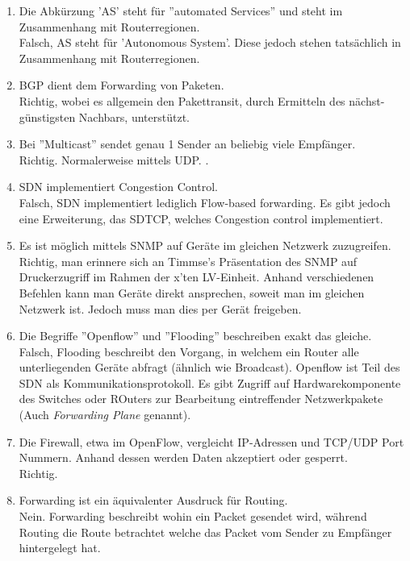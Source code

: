 \documentclass{article}
\begin{document}
\begin{enumerate}
        \item Die Abkürzung 'AS' steht für ''automated Services'' und steht im Zusammenhang mit Routerregionen.\\
        Falsch, AS steht für 'Autonomous System'. Diese jedoch stehen tatsächlich in Zusammenhang mit Routerregionen.
        
        \item BGP dient dem Forwarding von Paketen.\\
        Richtig, wobei es allgemein den Pakettransit, durch Ermitteln des nächst-günstigsten Nachbars, unterstützt.
        
        \item Bei ''Multicast'' sendet genau 1 Sender an beliebig viele Empfänger.\\
        Richtig. Normalerweise mittels UDP.
        .
        \item SDN implementiert Congestion Control.\\
        Falsch, SDN implementiert lediglich Flow-based forwarding. Es gibt jedoch eine Erweiterung, das SDTCP, welches Congestion control implementiert. 
        
        \item Es ist möglich mittels SNMP auf Geräte im gleichen Netzwerk zuzugreifen.\\
        Richtig, man erinnere sich an Timmse's Präsentation des SNMP auf Druckerzugriff im Rahmen der x'ten LV-Einheit. Anhand verschiedenen Befehlen kann man Geräte direkt ansprechen, soweit man im gleichen Netzwerk ist. Jedoch muss man dies per Gerät freigeben.
        
        \item Die Begriffe ''Openflow'' und ''Flooding'' beschreiben exakt das gleiche.\\
        Falsch, Flooding beschreibt den Vorgang, in welchem ein Router alle unterliegenden Geräte abfragt (ähnlich wie Broadcast). Openflow ist Teil des SDN als Kommunikationsprotokoll. Es gibt Zugriff auf Hardwarekomponente des Switches oder ROuters zur Bearbeitung eintreffender Netzwerkpakete (Auch \textit{Forwarding Plane} genannt).
        
        \item Die Firewall, etwa im OpenFlow, vergleicht IP-Adressen und TCP/UDP Port Nummern. Anhand dessen werden Daten akzeptiert oder gesperrt.\\
        Richtig.
        
        \item Forwarding ist ein äquivalenter Ausdruck für Routing.\\
        Nein. Forwarding beschreibt wohin ein Packet gesendet wird, während Routing die Route betrachtet welche das Packet vom Sender zu Empfänger hintergelegt hat.
        

\end{enumerate}
\end{document}
